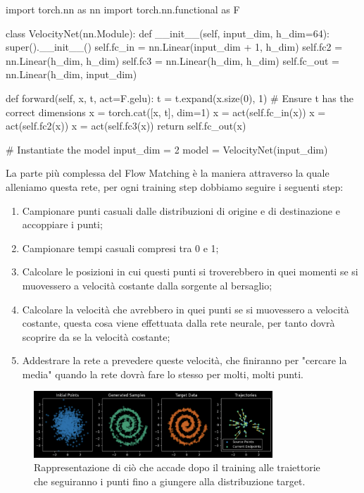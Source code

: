\begin{python}[frame=trBL]
import torch.nn as nn
import torch.nn.functional as F

class VelocityNet(nn.Module):
    def __init__(self, input_dim, h_dim=64):
        super().__init__()
        self.fc_in  = nn.Linear(input_dim + 1, h_dim)
        self.fc2    = nn.Linear(h_dim, h_dim)
        self.fc3    = nn.Linear(h_dim, h_dim)
        self.fc_out = nn.Linear(h_dim, input_dim)
    
    def forward(self, x, t, act=F.gelu):
        t = t.expand(x.size(0), 1)  
        # Ensure t has the correct dimensions
        x = torch.cat([x, t], dim=1)
        x = act(self.fc_in(x))
        x = act(self.fc2(x))
        x = act(self.fc3(x))
        return self.fc_out(x)

# Instantiate the model
input_dim = 2
model = VelocityNet(input_dim)
\end{python}

La parte più complessa del Flow Matching è la maniera attraverso la quale alleniamo questa rete, per ogni training step dobbiamo seguire i seguenti step:

\begin{enumerate}
    \item Campionare punti casuali dalle distribuzioni di origine e di destinazione e accoppiare i punti;
    \item Campionare tempi casuali compresi tra 0 e 1;
    \item  Calcolare le posizioni in cui questi punti si troverebbero in quei momenti se si muovessero a velocità costante dalla sorgente al bersaglio;
    \item Calcolare la velocità che avrebbero in quei punti se si muovessero a velocità costante, questa cosa viene effettuata dalla rete neurale, per tanto dovrà scoprire da se la velocità costante;
    \item Addestrare la rete a prevedere queste velocità, che finiranno per "cercare la media" quando la rete dovrà fare lo stesso per molti, molti punti.
\end{enumerate}

\begin{figure}[hbtp]
    \centering
    \includegraphics[width=0.8\textwidth]{figure/TrajFM}
    \caption{Rappresentazione di ciò che accade dopo il training alle traiettorie che seguiranno i punti fino a giungere alla distribuzione target.}
    \label{fig:trajFM}
\end{figure}

